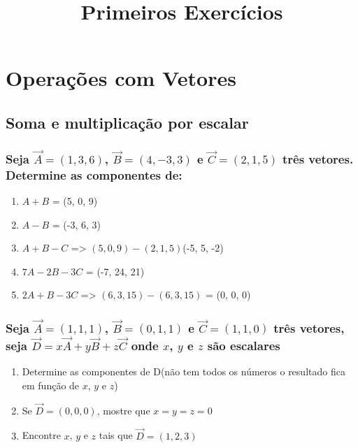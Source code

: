\documentclass[a4paper,10pt]{article}
\title{Primeiros Exercícios}
\author{}
\begin{document}
\maketitle

\section{Operações com Vetores}

\subsection{Soma e multiplicação por escalar}

\subsubsection{Seja $\vec{A}=(1,3,6)$, $\vec{B}=(4,-3,3)$ e $\vec{C}=(2,1,5)$ três vetores. Determine as componentes de:}

\begin{enumerate}
 \item $A + B$ = 
 (5, 0, 9) 
 
 \item $A - B$ = 
 (-3, 6, 3)
 
 \item $A + B - C$ =>
  $(5, 0, 9) - (2, 1, 5)$(-5, 5, -2)
 
 \item $7A - 2B - 3C$ = 
 (-7, 24, 21)
 
 \item $2A + B - 3C$ => 
 $(6, 3, 15) - (6, 3, 15)$ = (0, 0, 0)

\end{enumerate}

\subsubsection{Seja $\vec{A}=(1,1,1)$, $\vec{B}=(0,1,1)$ e $\vec{C}=(1,1,0)$ três vetores, seja 
$\vec{D}=x\vec{A} + y\vec{B} + z\vec{C}$ onde $x$, $y$ e $z$ são escalares}

\begin{enumerate}
 \item Determine as componentes de D(não tem todos os números o resultado fica em função de $x$, $y$ e $z$)
 \item Se $\vec{D}=(0,0,0)$, mostre que $x=y=z=0$
 \item Encontre $x$, $y$ e $z$ tais que $\vec{D}=(1,2,3)$
\end{enumerate}
\end{document}
